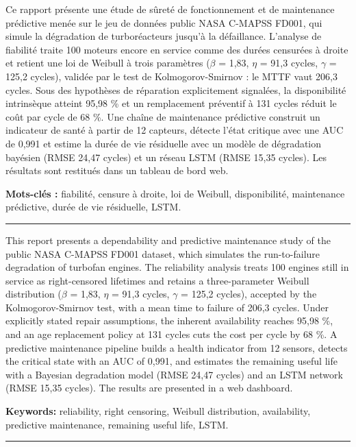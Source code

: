 \clearpage\pagestyle{empty}\thispagestyle{empty}
\small

\par\medskip

Ce rapport présente une étude de sûreté de fonctionnement et de maintenance prédictive menée sur le jeu de données public NASA C-MAPSS FD001, qui simule la dégradation de turboréacteurs jusqu'à la défaillance. L'analyse de fiabilité traite 100 moteurs encore en service comme des durées censurées à droite et retient une loi de Weibull à trois paramètres (\ensuremath{\beta} = 1,83, \ensuremath{\eta} = 91,3 cycles, \ensuremath{\gamma} = 125,2 cycles), validée par le test de Kolmogorov-Smirnov : le MTTF vaut 206,3 cycles. Sous des hypothèses de réparation explicitement signalées, la disponibilité intrinsèque atteint 95,98 \% et un remplacement préventif à 131 cycles réduit le coût par cycle de 68 \%. Une chaîne de maintenance prédictive construit un indicateur de santé à partir de 12 capteurs, détecte l'état critique avec une AUC de 0,991 et estime la durée de vie résiduelle avec un modèle de dégradation bayésien (RMSE 24,47 cycles) et un réseau LSTM (RMSE 15,35 cycles). Les résultats sont restitués dans un tableau de bord web.

\textbf{Mots-clés :} fiabilité, censure à droite, loi de Weibull, disponibilité, maintenance prédictive, durée de vie résiduelle, LSTM.

\par\medskip\noindent\rule{\linewidth}{0.4pt}\par\medskip
{}\par\medskip

This report presents a dependability and predictive maintenance study of the public NASA C-MAPSS FD001 dataset, which simulates the run-to-failure degradation of turbofan engines. The reliability analysis treats 100 engines still in service as right-censored lifetimes and retains a three-parameter Weibull distribution (\ensuremath{\beta} = 1,83, \ensuremath{\eta} = 91,3 cycles, \ensuremath{\gamma} = 125,2 cycles), accepted by the Kolmogorov-Smirnov test, with a mean time to failure of 206,3 cycles. Under explicitly stated repair assumptions, the inherent availability reaches 95,98 \%, and an age replacement policy at 131 cycles cuts the cost per cycle by 68 \%. A predictive maintenance pipeline builds a health indicator from 12 sensors, detects the critical state with an AUC of 0,991, and estimates the remaining useful life with a Bayesian degradation model (RMSE 24,47 cycles) and an LSTM network (RMSE 15,35 cycles). The results are presented in a web dashboard.

\textbf{Keywords:} reliability, right censoring, Weibull distribution, availability, predictive maintenance, remaining useful life, LSTM.

\par\medskip\noindent\rule{\linewidth}{0.4pt}\par\medskip
\arabicabstract
